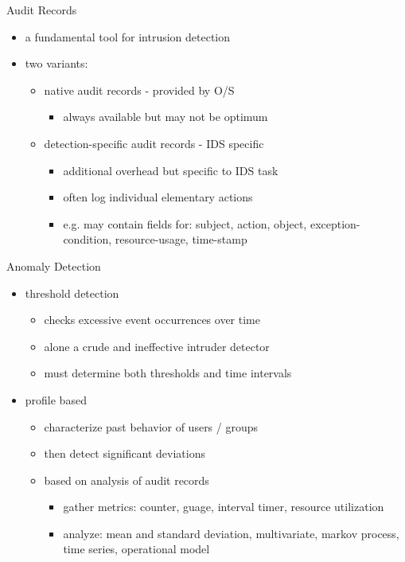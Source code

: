 \documentclass{beamer}
\begin{document}
\begin{frame}{Audit Records}
  \begin{itemize}
  \item a fundamental tool for intrusion detection 
  \item two variants: 
    \begin{itemize}
    \item native audit records - provided by O/S 
      \begin{itemize}
      \item always available but may not be optimum 
      \end{itemize}
    \item detection-specific audit records - IDS specific 
      \begin{itemize}
      \item additional overhead but specific to IDS task 
      \item often log individual elementary actions 
      \item e.g. may contain fields for: subject, action, object, 
        exception-condition, resource-usage, time-stamp
      \end{itemize}
    \end{itemize}
  \end{itemize}
\end{frame}

\begin{frame}{Anomaly Detection}
  \begin{itemize}
  \item threshold detection 
    \begin{itemize}
    \item checks excessive event occurrences over time 
    \item alone a crude and ineffective intruder detector 
    \item must determine both thresholds and time intervals 
    \end{itemize}
  \item profile based 
    \begin{itemize}
    \item characterize past behavior of users / groups 
    \item then detect significant deviations 
    \item based on analysis of audit records 
      \begin{itemize}
      \item gather metrics: counter, guage, interval timer, resource utilization
      \item analyze: mean and standard deviation, multivariate, markov 
        process, time series, operational model 
      \end{itemize}
    \end{itemize}
  \end{itemize}
\end{frame}
\end{document}
